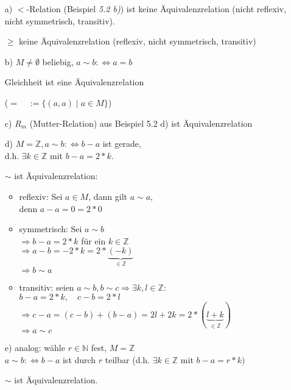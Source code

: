 \documentclass[a4paper, 12pt, twoside] {article}
\begin{document}
\begin{itemize}
\item[a)] $<$-Relation (Beispiel \textit{5.2 b)}) ist keine Äquivalenzrelation (nicht reflexiv, nicht symmetrisch, transitiv).

$\geq$ keine Äquivalenzrelation (reflexiv, nicht symmetrisch, transitiv)

\item[b)] $M \neq \emptyset$ beliebig, $a \sim b :\Leftrightarrow a = b$

Gleichheit ist eine Äquivalenzrelation

($= \quad := \{(a,a) \mid a \in M\}$)

\item[c)] $R_m$ (Mutter-Relation) aus Beispiel 5.2 d) ist Äquivalenzrelation


\item[d)] $M = \mathbb{Z}, a \sim b: \Leftrightarrow b - a$ ist gerade, \\
d.h. $\exists k \in \mathbb{Z}$ mit $b-a = 2*k$.

$\sim$ ist Äquivalenzrelation:
\begin{itemize}
\item reflexiv: Sei $a \in M$, dann gilt $a \sim a$, \\
denn $a-a = 0 = 2*0$

\item symmetrisch: Sei $a \sim b$ \\
$\Rightarrow b-a = 2*k$ für ein $k \in \mathbb{Z}$ \\
$\Rightarrow a-b = -2*k = 2* \underbrace{(-k)}_{\in \mathbb{Z}}$ \\
$\Rightarrow b \sim a$

\item transitiv: seien $a \sim b, b \sim c \Rightarrow \exists k, l \in \mathbb{Z}$: \\
$b-a = 2*k, \quad c-b = 2*l$ \\
$\Rightarrow c-a = (c-b) + (b-a) = 2l + 2k = 2*(\underbrace{l+k}_{\in \mathbb{Z}})$ \\
$\Rightarrow a \sim c$

\end{itemize}

\item[e)] analog: wähle $r \in \mathbb{N}$ fest, $M = \mathbb{Z}$ \\
$a \sim b: \Leftrightarrow b - a$ ist durch $r$ teilbar (d.h. $\exists k \in \mathbb{Z}$ mit $b-a = r*k)$

$\sim$ ist Äquivalenzrelation.

\end{itemize}
\end{document}
